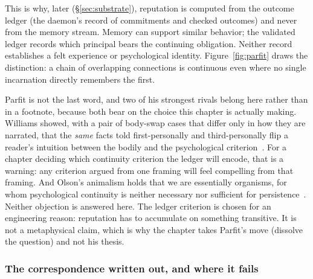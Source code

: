 \documentclass[11pt,a4paper]{article}
\theoremstyle{definition}
\begin{document}

\noindent This is why, later (\S\ref{sec:substrate}), reputation is computed
from the outcome ledger (the daemon's record of commitments and checked
outcomes) and never from the memory stream.
Memory can support similar behavior; the validated ledger records which
principal bears the continuing obligation. Neither record establishes a felt
experience or psychological identity. Figure~\ref{fig:parfit} draws the
distinction: a chain of overlapping connections is continuous even where no single
incarnation directly remembers the first.




Parfit is not the last word, and two of his strongest rivals belong here rather
than in a footnote, because both bear on the choice this chapter is actually
making. Williams showed, with a pair of body-swap cases that differ only in
how they are narrated, that the \emph{same} facts told first-personally and
third-personally flip a reader's intuition between the bodily and the
psychological criterion~. For a chapter deciding which
continuity criterion the ledger will encode, that is a warning: any criterion
argued from one framing will feel compelling from that framing. And Olson's
animalism holds that we are essentially organisms, for whom psychological
continuity is neither necessary nor sufficient for
persistence~. Neither objection is answered here. The ledger
criterion is chosen for an engineering reason: reputation has to accumulate on
something transitive. It is not a metaphysical claim, which is why the chapter
takes Parfit's move (dissolve the question) and not his thesis.

\subsubsection{The correspondence written out, and where it
fails}\label{sec:parfit-lineage-map}
\end{document}
